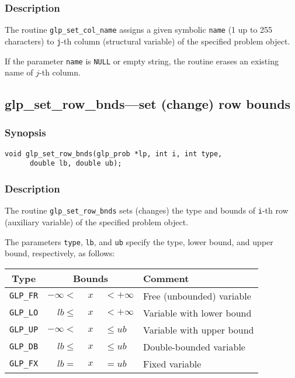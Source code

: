 \subsubsection*{Description}

The routine \verb|glp_set_col_name| assigns a given symbolic
\verb|name| (1 up to 255 characters) to \verb|j|-th column (structural
variable) of the specified problem object.

If the parameter \verb|name| is \verb|NULL| or empty string, the routine
erases an existing name of $j$-th column.

\subsection{glp\_set\_row\_bnds---set (change) row bounds}

\subsubsection*{Synopsis}

\begin{verbatim}
void glp_set_row_bnds(glp_prob *lp, int i, int type,
      double lb, double ub);
\end{verbatim}

\subsubsection*{Description}

The routine \verb|glp_set_row_bnds| sets (changes) the type and bounds
of \verb|i|-th row (auxiliary variable) of the specified problem object.

The parameters \verb|type|, \verb|lb|, and \verb|ub| specify the type,
lower bound, and upper bound, respectively, as follows:

\begin{center}
\begin{tabular}{cr@{}c@{}ll}
Type & \multicolumn{3}{c}{Bounds} & Comment \\
\hline
\verb|GLP_FR| & $-\infty <$ &$\ x\ $& $< +\infty$
   & Free (unbounded) variable \\
\verb|GLP_LO| & $lb \leq$ &$\ x\ $& $< +\infty$
   & Variable with lower bound \\
\verb|GLP_UP| & $-\infty <$ &$\ x\ $& $\leq ub$
   & Variable with upper bound \\
\verb|GLP_DB| & $lb \leq$ &$\ x\ $& $\leq ub$
   & Double-bounded variable \\
\verb|GLP_FX| & $lb =$ &$\ x\ $& $= ub$
   & Fixed variable \\
\end{tabular}
\end{center}

